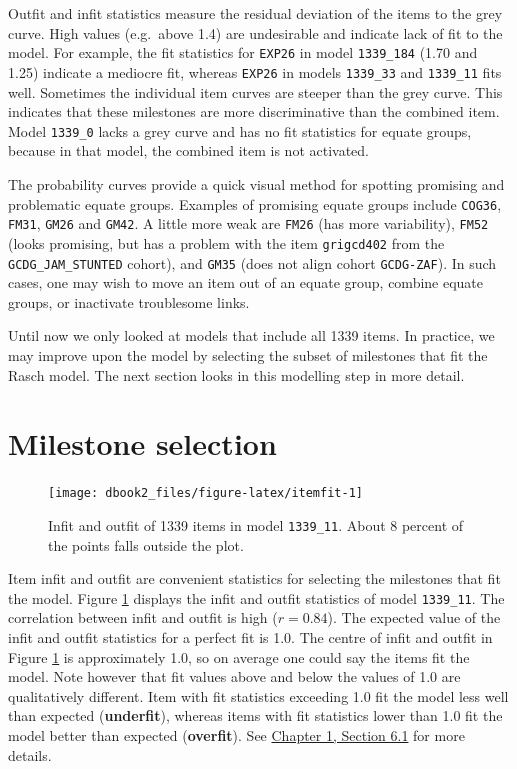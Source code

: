 \documentclass[
]{book}
\begin{document}
Outfit and infit statistics measure the residual deviation of the items to the grey curve. High values (e.g.~above 1.4) are undesirable and indicate lack of fit to the model. For example, the fit statistics for \texttt{EXP26} in model \texttt{1339\_184} (1.70 and 1.25) indicate a mediocre fit, whereas \texttt{EXP26} in models \texttt{1339\_33} and \texttt{1339\_11} fits well. Sometimes the individual item curves are steeper than the grey curve. This indicates that these milestones are more discriminative than the combined item. Model \texttt{1339\_0} lacks a grey curve and has no fit statistics for equate groups, because in that model, the combined item is not activated.

The probability curves provide a quick visual method for spotting promising and problematic equate groups. Examples of promising equate groups include \texttt{COG36}, \texttt{FM31}, \texttt{GM26} and \texttt{GM42}. A little more weak are \texttt{FM26} (has more variability), \texttt{FM52} (looks promising, but has a problem with the item \texttt{grigcd402} from the \texttt{GCDG\_JAM\_STUNTED} cohort), and \texttt{GM35} (does not align cohort \texttt{GCDG-ZAF}). In such cases, one may wish to move an item out of an equate group, combine equate groups, or inactivate troublesome links.

Until now we only looked at models that include all 1339 items. In practice, we may improve upon the model by selecting the subset of milestones that fit the Rasch model. The next section looks in this modelling step in more detail.

\hypertarget{sec:milestoneselection}{%
\section{Milestone selection}\label{sec:milestoneselection}}

\begin{figure}

{\centering \texttt{[image: dbook2\_files/figure-latex/itemfit-1]} 

}

\caption{Infit and outfit of 1339 items in model \texttt{1339\_11}. About 8 percent of the points falls outside the plot.}\label{fig:itemfit}
\end{figure}



Item infit and outfit are convenient statistics for selecting the milestones that fit the model. Figure \ref{fig:itemfit} displays the infit and outfit statistics of model \texttt{1339\_11}. The correlation between infit and outfit is high (\(r = 0.84\)). The expected value of the infit and outfit statistics for a perfect fit is 1.0. The centre of infit and outfit in Figure \ref{fig:itemfit} is approximately 1.0, so on average one could say the items fit the model. Note however that fit values above and below the values of 1.0 are qualitatively different. Item with fit statistics exceeding 1.0 fit the model less well than expected (\textbf{underfit}), whereas items with fit statistics lower than 1.0 fit the model better than expected (\textbf{overfit}). See \href{https://d-score.org/dbook1/sec-itemfit.html}{Chapter 1, Section 6.1} for more details.
\end{document}

